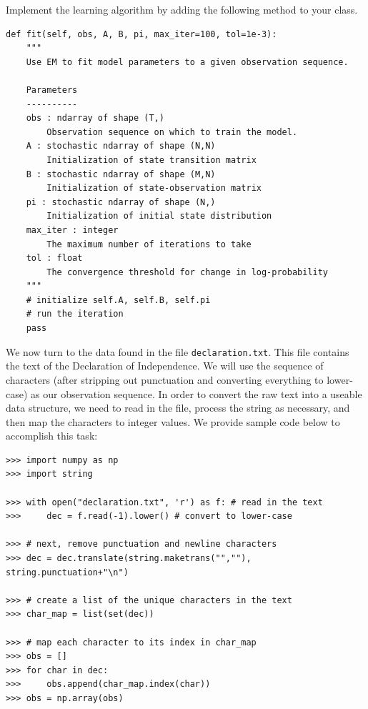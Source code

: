 \begin{problem}
Implement the learning algorithm by adding the following method to your class.
\begin{lstlisting}
def fit(self, obs, A, B, pi, max_iter=100, tol=1e-3):
    """
    Use EM to fit model parameters to a given observation sequence.

    Parameters
    ----------
    obs : ndarray of shape (T,)
        Observation sequence on which to train the model.
    A : stochastic ndarray of shape (N,N)
        Initialization of state transition matrix
    B : stochastic ndarray of shape (M,N)
        Initialization of state-observation matrix
    pi : stochastic ndarray of shape (N,)
        Initialization of initial state distribution
    max_iter : integer
        The maximum number of iterations to take
    tol : float
        The convergence threshold for change in log-probability
    """
    # initialize self.A, self.B, self.pi
    # run the iteration
    pass
\end{lstlisting}
\end{problem}

We now turn to the data found in the file {\tt declaration.txt}.
This file contains the text of the Declaration of Independence.
We will use the sequence of characters (after stripping out punctuation and converting everything to lower-case) as our observation sequence.
In order to convert the raw text into a useable data structure, we need to read in the file, process the string as necessary, and then map the characters to integer values.
We provide sample code below to accomplish this task:
\begin{lstlisting}
>>> import numpy as np
>>> import string

>>> with open("declaration.txt", 'r') as f: # read in the text
>>>     dec = f.read(-1).lower() # convert to lower-case

>>> # next, remove punctuation and newline characters
>>> dec = dec.translate(string.maketrans("",""), string.punctuation+"\n")

>>> # create a list of the unique characters in the text
>>> char_map = list(set(dec))

>>> # map each character to its index in char_map
>>> obs = []
>>> for char in dec:
>>>     obs.append(char_map.index(char))
>>> obs = np.array(obs)
\end{lstlisting}

